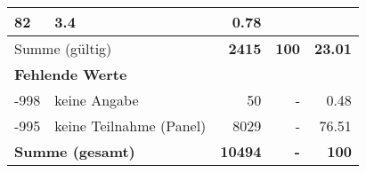 \begin{longtable}{lXrrr}
       \num{82} &
       \num[round-mode=places,round-precision=2]{3.4} &
         \num[round-mode=places,round-precision=2]{0.78} \\
     \midrule
     \multicolumn{2}{l}{Summe (gültig)} &
       \textbf{\num{2415}} &
     \textbf{\num{100}} &
       \textbf{\num[round-mode=places,round-precision=2]{23.01}} \\
     \multicolumn{5}{l}{\textbf{Fehlende Werte}}\\
       -998 &
       keine Angabe &
         \num{50} &
        - &
         \num[round-mode=places,round-precision=2]{0.48} \\
       -995 &
       keine Teilnahme (Panel) &
         \num{8029} &
        - &
         \num[round-mode=places,round-precision=2]{76.51} \\
     \midrule
     \multicolumn{2}{l}{\textbf{Summe (gesamt)}} &
          \textbf{\num{10494}} &
        \textbf{-} &
        \textbf{\num{100}} \\
     \bottomrule
     \end{longtable}
     
